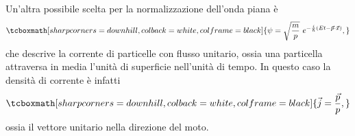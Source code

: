 Un'altra possibile scelta per la normalizzazione dell'onda piana è
	\begin{equation}
		\tcboxmath[sharp corners=downhill, colback=white, colframe=black]{	
			\psi  = \sqrt{\frac{m}{p}}\ e^{-\frac{i}{\hbar} (Et - \vec{p}\cdot \vec{x})},
			}
	\end{equation}
che descrive la corrente di particelle con flusso unitario, ossia una particella attraversa in media l'unità di superficie nell'unità di tempo. In questo caso la densità di corrente è infatti
	\begin{equation}
		\tcboxmath[sharp corners=downhill, colback=white, colframe=black]{
			\vec{j}=  \frac{\vec{p}}{p},
			}
	\end{equation}
ossia il vettore unitario nella direzione del moto.
